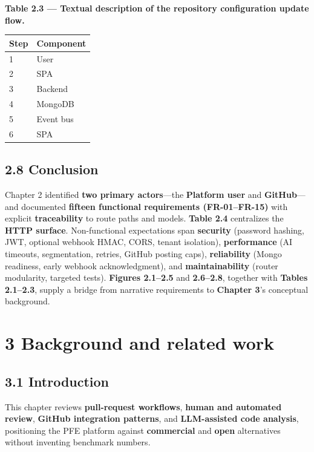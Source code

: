 \documentclass[11pt,a4paper]{report}
\begin{document}
\textbf{Table 2.3 — Textual description of the repository configuration update flow.}


\begingroup\small
\begin{tabular}{@{}p{}p{}@{}}
\toprule
Step & Component \\
\midrule
1 & User \\
2 & SPA \\
3 & Backend \\
4 & MongoDB \\
5 & Event bus \\
6 & SPA \\
\bottomrule
\end{tabular}
\endgroup


\section{2.8 Conclusion}


Chapter 2 identified \textbf{two primary actors}—the \textbf{Platform user} and \textbf{GitHub}—and documented \textbf{fifteen functional requirements (FR-01–FR-15)} with explicit \textbf{traceability} to route paths and models. \textbf{Table 2.4} centralizes the \textbf{HTTP surface}. Non-functional expectations span \textbf{security} (password hashing, JWT, optional webhook HMAC, CORS, tenant isolation), \textbf{performance} (AI timeouts, segmentation, retries, GitHub posting caps), \textbf{reliability} (Mongo readiness, early webhook acknowledgment), and \textbf{maintainability} (router modularity, targeted tests). \textbf{Figures 2.1–2.5} and \textbf{2.6–2.8}, together with \textbf{Tables 2.1–2.3}, supply a bridge from narrative requirements to \textbf{Chapter 3}’s conceptual background.



\chapter{3 Background and related work}


\section{3.1 Introduction}


This chapter reviews \textbf{pull-request workflows}, \textbf{human and automated review}, \textbf{GitHub integration patterns}, and \textbf{LLM-assisted code analysis}, positioning the PFE platform against \textbf{commercial} and \textbf{open} alternatives without inventing benchmark numbers.
\end{document}
